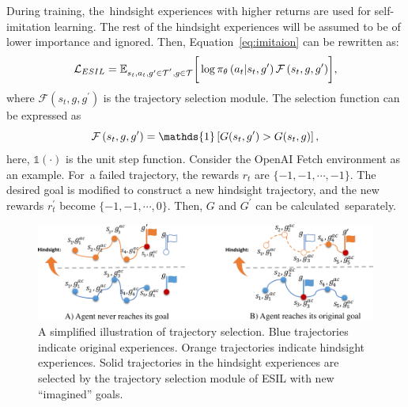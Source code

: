 During training, the~hindsight experiences with higher returns are used for self-imitation learning. The rest of the hindsight experiences will be assumed to be of lower importance and ignored.
Then, Equation~\eqref{eq:imitaion} can be rewritten as:
\begin{equation}
  \centering
  \mathcal{L}_{ESIL}=\mathbb{E}_{s_{t}, a_{t}, g^\prime\in\Tau^{'},g\in\Tau}\biggr[\log\pi_{\theta}\left(a_{t}|s_{t}, g^\prime\right)\mathcal{F}\left(s_{t}, g, g^\prime\right)\biggr],
  \label{eq:final_loss}
\end{equation}
where $\mathcal{F}\left(s_{t}, g, g^{\prime}\right)$ is the trajectory selection module. The selection function can be expressed as
\begin{equation}
  \centering
  \mathcal{F}\left(s_{t}, g, g^\prime \right)=\mathds{1}\left[G(s_{t}, g^\prime) > G(s_{t}, g)\right],
\end{equation}
here, {$\mathds{1}(\cdot)$ is the unit step function}. Consider the OpenAI Fetch environment as an example. For~a failed trajectory, the rewards $r_{t}$ are $\{-1,-1,\cdots, -1\}$. {The desired goal is modified} to construct a new hindsight trajectory, and the new rewards $r_{t}^{\prime}$ become $\{-1,-1,\cdots, 0\}$. Then,  {$G$ and $G^{\prime}$ can be calculated~separately.}
\begin{figure}[t!]
  \centering
  \includegraphics[width=\columnwidth]{figures/chapter3/hgs.png}
  \caption[A simplified illustration of trajectory selection.]{A simplified illustration of trajectory selection. Blue trajectories indicate original experiences. Orange trajectories indicate hindsight experiences. Solid trajectories in the hindsight experiences are selected by the trajectory selection module of ESIL with new ``imagined'' goals.}
  \label{fig:hs_princple}
\end{figure}

